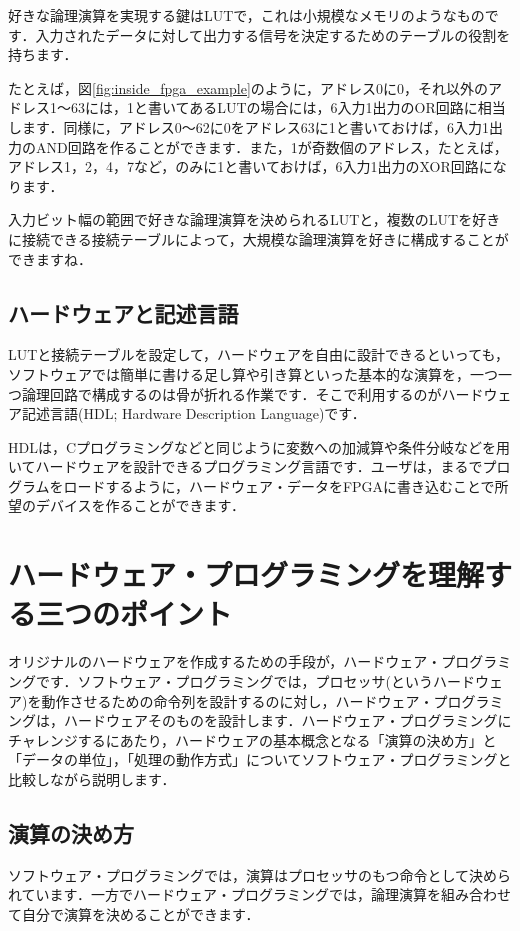 \documentclass[a4paper,dvipdfmx]{jsarticle}
\begin{document}
好きな論理演算を実現する鍵はLUTで，これは小規模なメモリのようなものです．入力されたデータに対して出力する信号を決定するためのテーブルの役割を持ちます．

たとえば，図\ref{fig:inside_fpga_example}のように，アドレス0に0，それ以外のアドレス1〜63には，1と書いてあるLUTの場合には，6入力1出力のOR回路に相当します．同様に，アドレス0〜62に0をアドレス63に1と書いておけば，6入力1出力のAND回路を作ることができます．また，1が奇数個のアドレス，たとえば，アドレス1，2，4，7など，のみに1と書いておけば，6入力1出力のXOR回路になります．

入力ビット幅の範囲で好きな論理演算を決められるLUTと，複数のLUTを好きに接続できる接続テーブルによって，大規模な論理演算を好きに構成することができますね．

\subsection{ハードウェアと記述言語}

LUTと接続テーブルを設定して，ハードウェアを自由に設計できるといっても，ソフトウェアでは簡単に書ける足し算や引き算といった基本的な演算を，一つ一つ論理回路で構成するのは骨が折れる作業です．そこで利用するのがハードウェア記述言語(HDL; Hardware Description Language)です．

HDLは，Cプログラミングなどと同じように変数への加減算や条件分岐などを用いてハードウェアを設計できるプログラミング言語です．ユーザは，まるでプログラムをロードするように，ハードウェア・データをFPGAに書き込むことで所望のデバイスを作ることができます．

\section{ハードウェア・プログラミングを理解する三つのポイント}

オリジナルのハードウェアを作成するための手段が，ハードウェア・プログラミングです．ソフトウェア・プログラミングでは，プロセッサ(というハードウェア)を動作させるための命令列を設計するのに対し，ハードウェア・プログラミングは，ハードウェアそのものを設計します．ハードウェア・プログラミングにチャレンジするにあたり，ハードウェアの基本概念となる「演算の決め方」と「データの単位」，「処理の動作方式」についてソフトウェア・プログラミングと比較しながら説明します．

\subsection{演算の決め方}
ソフトウェア・プログラミングでは，演算はプロセッサのもつ命令として決められています．一方でハードウェア・プログラミングでは，論理演算を組み合わせて自分で演算を決めることができます．
\end{document}
